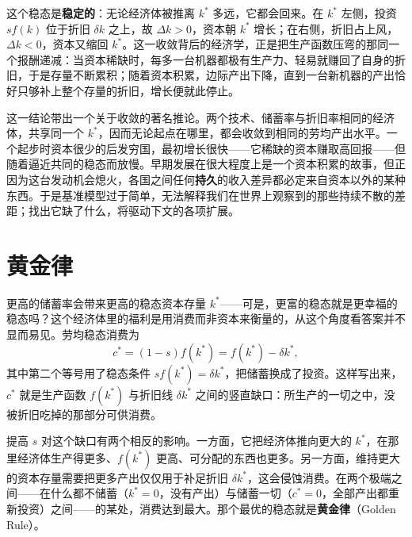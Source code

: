 这个稳态是\textbf{稳定的}：无论经济体被推离 $k^*$ 多远，它都会回来。在 $k^*$ 左侧，投资 $s f(k)$ 位于折旧 $\delta k$ 之上，故 $\Delta k > 0$，资本朝 $k^*$ 增长；在右侧，折旧占上风，$\Delta k < 0$，资本又缩回 $k^*$。这一收敛背后的经济学，正是把生产函数压弯的那同一个报酬递减：当资本稀缺时，每多一台机器都极有生产力、轻易就赚回了自身的折旧，于是存量不断累积；随着资本积累，边际产出下降，直到一台新机器的产出恰好只够补上整个存量的折旧，增长便就此停止。


这一结论带出一个关于收敛的著名推论。两个技术、储蓄率与折旧率相同的经济体，共享同一个 $k^*$，因而无论起点在哪里，都会收敛到相同的劳均产出水平。一个起步时资本很少的后发穷国，最初增长很快——它稀缺的资本赚取高回报——但随着逼近共同的稳态而放慢。早期发展在很大程度上是一个资本积累的故事，但正因为这台发动机会熄火，各国之间任何\textbf{持久}的收入差异都必定来自资本以外的某种东西。于是基准模型过于简单，无法解释我们在世界上观察到的那些持续不散的差距；找出它缺了什么，将驱动下文的各项扩展。

\section{黄金律}

更高的储蓄率会带来更高的稳态资本存量 $k^*$——可是，更富的稳态就是更幸福的稳态吗？这个经济体里的福利是用消费而非资本来衡量的，从这个角度看答案并不显而易见。劳均稳态消费为
\[
c^* = (1-s) f(k^*) = f(k^*) - \delta k^*,
\]
其中第二个等号用了稳态条件 $s f(k^*) = \delta k^*$，把储蓄换成了投资。这样写出来，$c^*$ 就是生产函数 $f(k^*)$ 与折旧线 $\delta k^*$ 之间的竖直缺口：所生产的一切之中，没被折旧吃掉的那部分可供消费。

提高 $s$ 对这个缺口有两个相反的影响。一方面，它把经济体推向更大的 $k^*$，在那里经济体生产得更多、$f(k^*)$ 更高、可分配的东西也更多。另一方面，维持更大的资本存量需要把更多产出仅仅用于补足折旧 $\delta k^*$，这会侵蚀消费。在两个极端之间——在什么都不储蓄（$k^* = 0$，没有产出）与储蓄一切（$c^* = 0$，全部产出都重新投资）之间——的某处，消费达到最大。那个最优的稳态就是\textbf{黄金律}（Golden Rule）。


